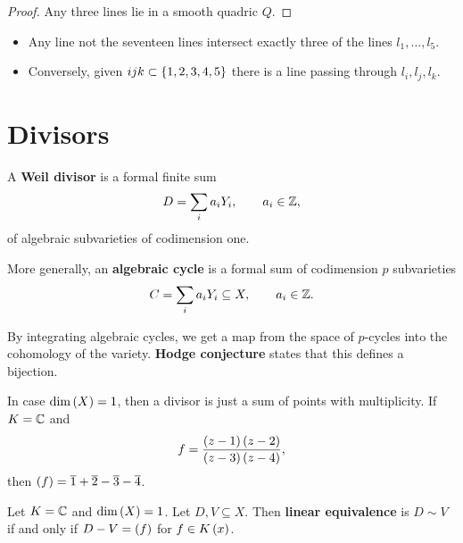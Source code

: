 \begin{proof}
Any three lines lie in a smooth quadric $ Q $.
\end{proof}

\begin{lemma}
\hfill
\begin{itemize}
\item Any line not the seventeen lines intersect exactly three of the lines $ l_1, \dots, l_5 $.
\item Conversely, given $ ijk \subset \left\{ 1, 2, 3, 4, 5 \right\} $ there is a line passing through $ l_i, l_j, l_k $.
\end{itemize}
\end{lemma}

\pagebreak

\section{Divisors}


\begin{definition}
A \textbf{Weil divisor} is a formal finite sum
$$ D = \sum_i a_iY_i, \qquad a_i \in \mathbb{Z}, $$
of algebraic subvarieties of codimension one.
\end{definition}

\begin{definition}
More generally, an \textbf{algebraic cycle} is a formal sum of codimension $ p $ subvarieties
$$ C = \sum_i a_iY_i \subseteq X, \qquad a_i \in \mathbb{Z}. $$
\end{definition}

By integrating algebraic cycles, we get a map from the space of $ p $-cycles into the cohomology of the variety. \textbf{Hodge conjecture} states that this defines a bijection.

\begin{example*}
In case $ \dim\left( X \right) = 1 $, then a divisor is just a sum of points with multiplicity. If $ K = \mathbb{C} $ and
$$ f = \dfrac{\left( z - 1 \right)\left( z - 2 \right)}{\left( z - 3 \right)\left( z - 4 \right)}, $$
then $ \left( f \right) = \overline{1} + \overline{2} - \overline{3} - \overline{4} $.
\end{example*}

\begin{definition}
Let $ K = \mathbb{C} $ and $ \dim\left( X \right) = 1 $. Let $ D, V \subseteq X $. Then \textbf{linear equivalence} is $ D \sim V $ if and only if $ D - V = \left( f \right) $ for $ f \in K\left( x \right) $.
\end{definition}

